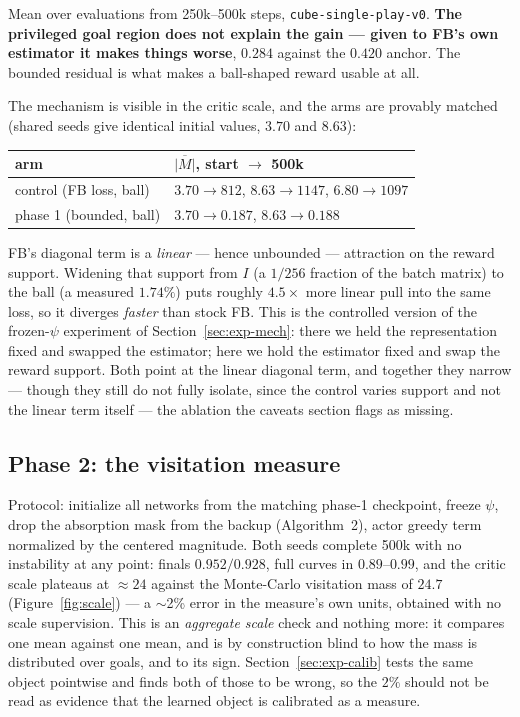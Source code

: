 \documentclass[10pt]{article}
\begin{document}
Mean over evaluations from 250k--500k steps, \texttt{cube-single-play-v0}.
\textbf{The privileged goal region does not explain the gain --- given to FB's
own estimator it makes things worse}, $0.284$ against the $0.420$ anchor. The
bounded residual is what makes a ball-shaped reward usable at all.

The mechanism is visible in the critic scale, and the arms are provably matched
(shared seeds give identical initial values, $3.70$ and $8.63$):

\begin{center}\small
\begin{tabular}{l l}
\toprule
arm & $\overline{|M|}$, start $\to$ 500k \\
\midrule
control (FB loss, ball) & $3.70\to812$, \; $8.63\to1147$, \; $6.80\to1097$ \\
phase 1 (bounded, ball) & $3.70\to0.187$, \; $8.63\to0.188$ \\
\bottomrule
\end{tabular}
\end{center}

FB's diagonal term is a \emph{linear} --- hence unbounded --- attraction on the
reward support. Widening that support from $I$ (a $1/256$ fraction of the batch
matrix) to the ball (a measured $1.74\%$) puts roughly $4.5\times$ more linear
pull into the same loss, so it diverges \emph{faster} than stock FB. This is the
controlled version of the frozen-$\psi$ experiment of
Section~\ref{sec:exp-mech}: there we held the representation fixed and swapped
the estimator; here we hold the estimator fixed and swap the reward support. Both
point at the linear diagonal term, and together they narrow --- though they still
do not fully isolate, since the control varies support and not the linear term
itself --- the ablation the caveats section flags as missing.

\subsection{Phase 2: the visitation measure}
\label{sec:exp-p2}

Protocol: initialize all networks from the matching phase-1 checkpoint, freeze
$\psi$, drop the absorption mask from the backup (Algorithm~2), actor greedy term
normalized by the centered magnitude.
Both seeds complete 500k with no instability at any point: finals
$\mathbf{0.952 / 0.928}$, full curves in $0.89$--$0.99$, and the critic scale
plateaus at $\approx 24$ against the Monte-Carlo visitation mass of $24.7$
(Figure~\ref{fig:scale}) --- a $\sim$2\% error in the measure's own units,
obtained with no scale supervision.
This is an \emph{aggregate scale} check and nothing more: it compares one mean
against one mean, and is by construction blind to how the mass is distributed
over goals, and to its sign. Section~\ref{sec:exp-calib} tests the same object
pointwise and finds both of those to be wrong, so the $2\%$ should not be read
as evidence that the learned object is calibrated as a measure.
\end{document}
